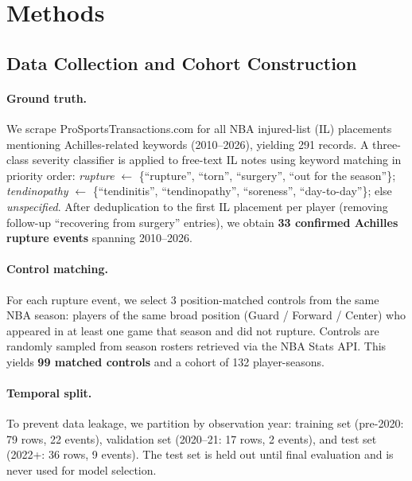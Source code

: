 \documentclass{article}
\begin{document}
\section{Methods}
\label{sec:methods}

\subsection{Data Collection and Cohort Construction}
\label{sec:data}

\paragraph{Ground truth.}
We scrape ProSportsTransactions.com for all NBA injured-list (IL) placements
mentioning Achilles-related keywords (2010--2026), yielding 291 records.
A three-class severity classifier is applied to free-text IL notes using
keyword matching in priority order: \textit{rupture} $\leftarrow$
\{``rupture'', ``torn'', ``surgery'', ``out for the season''\};
\textit{tendinopathy} $\leftarrow$ \{``tendinitis'', ``tendinopathy'',
``soreness'', ``day-to-day''\}; else \textit{unspecified}.  After
deduplication to the first IL placement per player (removing follow-up
``recovering from surgery'' entries), we obtain \textbf{33 confirmed Achilles
rupture events} spanning 2010--2026.

\paragraph{Control matching.}
For each rupture event, we select 3 position-matched controls from the same NBA
season: players of the same broad position (Guard / Forward / Center) who
appeared in at least one game that season and did not rupture.  Controls are
randomly sampled from season rosters retrieved via the NBA Stats API.
This yields \textbf{99 matched controls} and a cohort of 132 player-seasons.

\paragraph{Temporal split.}
To prevent data leakage, we partition by observation year: training set
(pre-2020: 79 rows, 22 events), validation set (2020--21: 17 rows, 2 events),
and test set (2022+: 36 rows, 9 events).  The test set is held out until final
evaluation and is never used for model selection.
\end{document}
